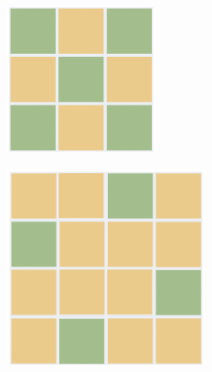 \documentclass[12pt,leqno]{article}
\theoremstyle{theoremdd}
\begin{document}
\begin{figure}[ht]
    \caption{פתרונות של משחק על לוחות שונים}
    \label{fig:sol_3_4_5}
    \centering
    \begin{subfigure}[b]{.25\linewidth}
    \includegraphics[width=0.95\linewidth]{images/3x3_sol.PNG}
    \end{subfigure}
    \begin{subfigure}[b]{.25\linewidth}
    \includegraphics[width=0.97\linewidth]{images/4x4_sol.PNG}

\end{subfigure}
\end{figure}
\end{document}
